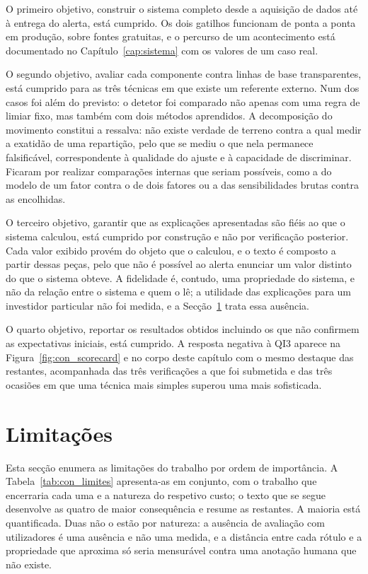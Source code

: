 O primeiro objetivo, construir o sistema completo desde a aquisição de dados até à entrega do alerta,
está cumprido. Os dois gatilhos funcionam de ponta a ponta em produção, sobre fontes gratuitas, e o
percurso de um acontecimento está documentado no Capítulo~\ref{cap:sistema} com os valores de um caso
real.

O segundo objetivo, avaliar cada componente contra linhas de base transparentes, está cumprido
para as três técnicas em que existe um referente externo. Num dos casos foi além do previsto: o
detetor foi comparado não apenas com uma regra de limiar fixo, mas também com dois métodos
aprendidos.
A decomposição do movimento constitui a ressalva: não existe verdade de terreno contra a qual medir a
exatidão de uma repartição, pelo que se mediu o que nela permanece falsificável, correspondente à
qualidade do ajuste e à capacidade de discriminar. Ficaram por realizar comparações internas que
seriam possíveis, como a do modelo de um fator contra o de dois fatores ou a das sensibilidades
brutas contra as encolhidas.

O terceiro objetivo, garantir que as explicações apresentadas são fiéis ao que o sistema calculou,
está cumprido por construção e não por verificação posterior. Cada valor exibido provém do objeto que
o calculou, e o texto é composto a partir dessas peças, pelo que não é possível ao alerta enunciar um
valor distinto do que o sistema obteve. A fidelidade é, contudo, uma propriedade do sistema, e não da
relação entre o sistema e quem o lê; a utilidade das explicações para um investidor particular não
foi medida, e a Secção~\ref{sec:con_limitacoes} trata essa ausência.

O quarto objetivo, reportar os resultados obtidos incluindo os que não confirmem as expectativas
iniciais, está cumprido. A resposta negativa à \gls{QI}3 aparece na Figura~\ref{fig:con_scorecard}
e no corpo deste capítulo com o mesmo destaque das restantes, acompanhada das três verificações a
que foi submetida e das três ocasiões em que uma técnica mais simples superou uma mais
sofisticada.

\section{Limitações}
\label{sec:con_limitacoes}

Esta secção enumera as limitações do trabalho por ordem de importância. A
Tabela~\ref{tab:con_limites} apresenta-as em conjunto, com o trabalho que encerraria cada uma e a
natureza do respetivo custo; o texto que se segue desenvolve as quatro de maior consequência e
resume as restantes. A maioria está quantificada. Duas não o estão por natureza: a ausência de
avaliação com utilizadores é uma ausência e não uma medida, e a distância entre cada rótulo e a
propriedade que aproxima só seria mensurável contra uma anotação humana que não existe.

